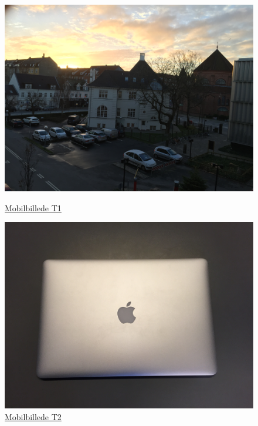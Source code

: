 \begin{figure}[!h]
\begin{minipage}[b]{0.3\linewidth}
\centering
\includegraphics[width=\textwidth]{Billeder/test_billeder/T1.jpg}
\caption{\href{https://www.dropbox.com/home/P1\%20-\%20B205/vejleder/billeder/Mobilbilleder/T1?preview=T1.jpg}{Mobilbillede \phantom{m} T1}}
\label{fig:T1}
\end{minipage}
\hspace{0.5cm}
\begin{minipage}[b]{0.3\linewidth}
\centering
\includegraphics[width=\textwidth]{Billeder/test_billeder/T2.jpg}
\caption{\href{https://www.dropbox.com/home/P1\%20-\%20B205/vejleder/billeder/Mobilbilleder/T2?preview=T2.jpg}{Mobilbillede T2}}

\end{minipage}
\end{figure}
